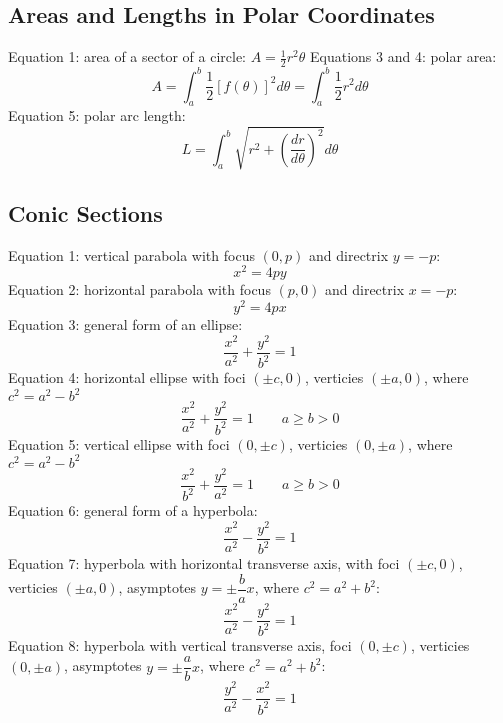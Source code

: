 \documentclass{article}
\begin{document}
    \subsection{Areas and Lengths in Polar Coordinates}
    \begin{outline}
        \1 Equation 1: area of a sector of a circle: \(A=\frac{1}{2}r^2\theta\)
        \1 Equations 3 and 4: polar area: \[A=\int^b_a\frac{1}{2}[f(\theta)]^2d\theta=\int^b_a\frac{1}{2}r^2d\theta\]
        \1 Equation 5: polar arc length: \[L=\int^b_a\sqrt{r^2+\left(\dfrac{dr}{d\theta}\right)^2}d\theta\]
    \end{outline}
    \subsection{Conic Sections}
    \begin{outline}
        \1 Equation 1: vertical parabola with focus \((0,p)\) and directrix \(y=-p\): \[x^2=4py\]
        \1 Equation 2: horizontal parabola with focus \((p,0)\) and directrix \(x=-p\): \[y^2=4px\]
        \1 Equation 3: general form of an ellipse: \[\dfrac{x^2}{a^2}+\dfrac{y^2}{b^2}=1\]
        \1 Equation 4: horizontal ellipse with foci \((\pm c,0)\), verticies \((\pm a,0)\), where \(c^2=a^2-b^2\) \[\dfrac{x^2}{a^2}+\dfrac{y^2}{b^2}=1\qquad a\geq b>0\]
        \1 Equation 5: vertical ellipse with foci \((0,\pm c)\), verticies \((0,\pm a)\), where \(c^2=a^2-b^2\) \[\dfrac{x^2}{b^2}+\dfrac{y^2}{a^2}=1\qquad a\geq b>0\]
        \1 Equation 6: general form of a hyperbola: \[\dfrac{x^2}{a^2}-\dfrac{y^2}{b^2}=1\]
        \1 Equation 7: hyperbola with horizontal transverse axis, with foci \((\pm c,0)\), verticies \((\pm a,0)\), asymptotes \(y=\pm\dfrac{b}{a}x\), where \(c^2=a^2+b^2\): \[\dfrac{x^2}{a^2}-\dfrac{y^2}{b^2}=1\]
        \1 Equation 8: hyperbola with vertical transverse axis, foci \((0,\pm c)\), verticies \((0,\pm a)\), asymptotes \(y=\pm\dfrac{a}{b}x\), where \(c^2=a^2+b^2\): \[\dfrac{y^2}{a^2}-\dfrac{x^2}{b^2}=1\]

    \end{outline}
\end{document}
